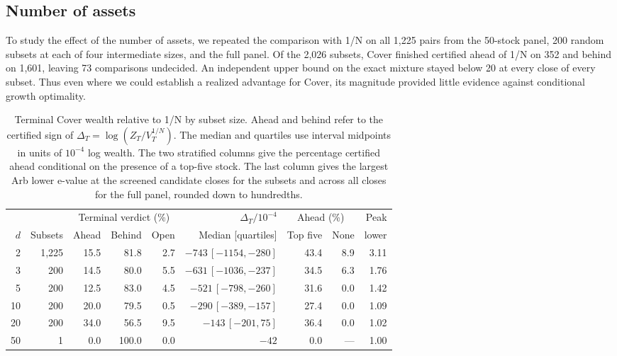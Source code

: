 \documentclass{article}
\numberwithin{equation}{section}
\theoremstyle{remark}
\begin{document}
\subsection{Number of assets}
To study the effect of the number of assets, we repeated the
comparison with 1/N on all 1,225 pairs from the 50-stock panel, 200 random
subsets at each of four intermediate sizes, and the full panel.
Of the 2,026 subsets, Cover finished certified ahead of 1/N on 352 and
behind on 1,601, leaving 73 comparisons undecided. An independent upper
bound on the exact mixture stayed below 20 at every close of every
subset. Thus even where we could establish a realized advantage for
Cover, its magnitude provided little evidence against conditional
growth optimality.

\begin{table}[!htbp]
\centering\small\setlength{\tabcolsep}{3.5pt}
\caption{Terminal Cover wealth relative to 1/N by subset size.
Ahead and behind refer to the certified sign of
$\Delta_T=\log(Z_T/V_T^{1/N})$. The median and quartiles use interval
midpoints in units of $10^{-4}$ log wealth. The two stratified columns
give the percentage certified ahead conditional on the presence of a
top-five stock. The last column gives the largest Arb lower e-value
at the screened candidate closes for the subsets and across all closes
for the full panel, rounded down to hundredths.}
\label{tab:subsets}
\begin{tabular}{rr rrr r rr r}
\toprule
 & & \multicolumn{3}{c}{Terminal verdict (\%)} & $\Delta_T/10^{-4}$ &
 \multicolumn{2}{c}{Ahead (\%)} & Peak\\
\cmidrule(lr){3-5}\cmidrule(lr){7-8}
$d$ & Subsets & Ahead & Behind & Open & Median [quartiles] &
Top five & None & lower\\
\midrule
2 & 1,225 & 15.5 & 81.8 & 2.7 & $-743\,[-1154,-280]$ & 43.4 & 8.9 & 3.11\\
3 & 200 & 14.5 & 80.0 & 5.5 & $-631\,[-1036,-237]$ & 34.5 & 6.3 & 1.76\\
5 & 200 & 12.5 & 83.0 & 4.5 & $-521\,[-798,-260]$ & 31.6 & 0.0 & 1.42\\
10 & 200 & 20.0 & 79.5 & 0.5 & $-290\,[-389,-157]$ & 27.4 & 0.0 & 1.09\\
20 & 200 & 34.0 & 56.5 & 9.5 & $-143\,[-201,75]$ & 36.4 & 0.0 & 1.02\\
50 & 1 & 0.0 & 100.0 & 0.0 & $-42$ & 0.0 & --- & 1.00\\
\bottomrule
\end{tabular}
\end{table}
\end{document}
